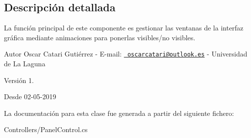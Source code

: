 \subsection{Descripción detallada}
La función principal de este componente es gestionar las ventanas de la interfaz gráfica mediante animaciones para ponerlas visibles/no visibles. \begin{DoxyAuthor}{Autor}
Oscar Catari Gutiérrez -\/ E-\/mail\+: \href{mailto:oscarcatari@outlook.es}{\texttt{ oscarcatari@outlook.\+es}} -\/ Universidad de La Laguna 
\end{DoxyAuthor}
\begin{DoxyVersion}{Versión}
1. 
\end{DoxyVersion}
\begin{DoxySince}{Desde}
02-\/05-\/2019 
\end{DoxySince}


La documentación para esta clase fue generada a partir del siguiente fichero\+:\begin{DoxyCompactItemize}
\item 
Controllers/Panel\+Control.\+cs\end{DoxyCompactItemize}
